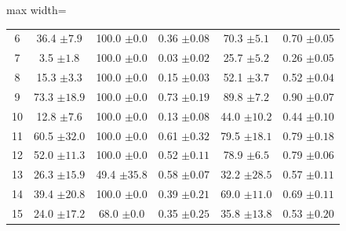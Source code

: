\begin{table}[!tp]
\begin{adjustbox}{max width=\textwidth}
\begin{tabular}{c|c|c|c|c|c}
    6 & 36.4 {\color{gray}\footnotesize $\pm 7.9$} & 100.0 {\color{gray}\footnotesize $\pm 0.0$} & 0.36 {\color{gray}\footnotesize $\pm 0.08$} & 70.3 {\color{gray}\footnotesize $\pm 5.1$} & 0.70 {\color{gray}\footnotesize $\pm 0.05$} \\
    7 & 3.5 {\color{gray}\footnotesize $\pm 1.8$} & 100.0 {\color{gray}\footnotesize $\pm 0.0$} & 0.03 {\color{gray}\footnotesize $\pm 0.02$} & 25.7 {\color{gray}\footnotesize $\pm 5.2$} & 0.26 {\color{gray}\footnotesize $\pm 0.05$} \\
    8 & 15.3 {\color{gray}\footnotesize $\pm 3.3$} & 100.0 {\color{gray}\footnotesize $\pm 0.0$} & 0.15 {\color{gray}\footnotesize $\pm 0.03$} & 52.1 {\color{gray}\footnotesize $\pm 3.7$} & 0.52 {\color{gray}\footnotesize $\pm 0.04$} \\
    9 & 73.3 {\color{gray}\footnotesize $\pm 18.9$} & 100.0 {\color{gray}\footnotesize $\pm 0.0$} & 0.73 {\color{gray}\footnotesize $\pm 0.19$} & 89.8 {\color{gray}\footnotesize $\pm 7.2$} & 0.90 {\color{gray}\footnotesize $\pm 0.07$} \\
    \midrule
    10 & 12.8 {\color{gray}\footnotesize $\pm 7.6$} & 100.0 {\color{gray}\footnotesize $\pm 0.0$} & 0.13 {\color{gray}\footnotesize $\pm 0.08$} & 44.0 {\color{gray}\footnotesize $\pm 10.2$} & 0.44 {\color{gray}\footnotesize $\pm 0.10$} \\
    11 & 60.5 {\color{gray}\footnotesize $\pm 32.0$} & 100.0 {\color{gray}\footnotesize $\pm 0.0$} & 0.61 {\color{gray}\footnotesize $\pm 0.32$} & 79.5 {\color{gray}\footnotesize $\pm 18.1$} & 0.79 {\color{gray}\footnotesize $\pm 0.18$} \\
    12 & 52.0 {\color{gray}\footnotesize $\pm 11.3$} & 100.0 {\color{gray}\footnotesize $\pm 0.0$} & 0.52 {\color{gray}\footnotesize $\pm 0.11$} & 78.9 {\color{gray}\footnotesize $\pm 6.5$} & 0.79 {\color{gray}\footnotesize $\pm 0.06$} \\
    13 & 26.3 {\color{gray}\footnotesize $\pm 15.9$} & 49.4 {\color{gray}\footnotesize $\pm 35.8$} & 0.58 {\color{gray}\footnotesize $\pm 0.07$} & 32.2 {\color{gray}\footnotesize $\pm 28.5$} & 0.57 {\color{gray}\footnotesize $\pm 0.11$} \\
    14 & 39.4 {\color{gray}\footnotesize $\pm 20.8$} & 100.0 {\color{gray}\footnotesize $\pm 0.0$} & 0.39 {\color{gray}\footnotesize $\pm 0.21$} & 69.0 {\color{gray}\footnotesize $\pm 11.0$} & 0.69 {\color{gray}\footnotesize $\pm 0.11$} \\
    15 & 24.0 {\color{gray}\footnotesize $\pm 17.2$} & 68.0 {\color{gray}\footnotesize $\pm 0.0$} & 0.35 {\color{gray}\footnotesize $\pm 0.25$} & 35.8 {\color{gray}\footnotesize $\pm 13.8$} & 0.53 {\color{gray}\footnotesize $\pm 0.20$} \\

\end{tabular}
\end{adjustbox}
\end{table}
